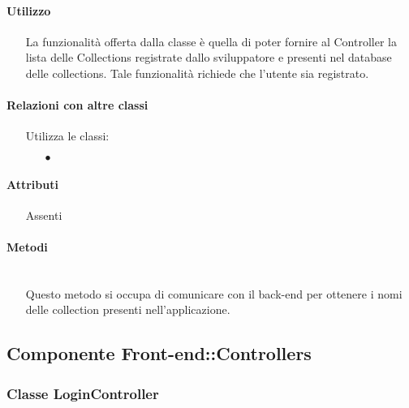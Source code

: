 \paragraph*{Utilizzo}
\begin{itemize}
\item[] La funzionalità offerta dalla classe è quella di poter fornire al Controller la lista delle Collections registrate dallo sviluppatore e presenti nel database delle collections.
Tale funzionalità richiede che l'utente sia registrato.
\end{itemize}

\paragraph*{Relazioni con altre classi}
\begin{itemize}


\item[] Utilizza le classi:
\begin{itemize}
\item[$\bullet$] 
\end{itemize}
\end{itemize}

\paragraph*{Attributi}
\begin{itemize}
\item[] Assenti
\end{itemize}

\paragraph*{Metodi}
\begin{itemize}
\item[]  \\ Questo metodo si occupa di comunicare con il back-end per ottenere i nomi delle collection presenti nell'applicazione.
\end{itemize}

\subsection{Componente Front-end::Controllers}

\subsubsection{Classe LoginController}

